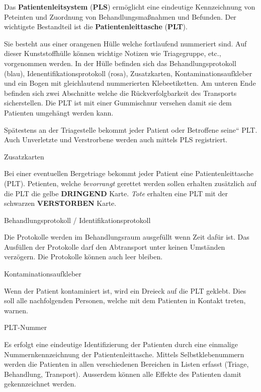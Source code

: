 \documentclass{article}
\newcommand\gT[1]{\textbf{\textup{\textcolor[rgb]{0.0,0.5019608,0.0}{#1}}}}
\newcommand\gE[1]{\textit{#1}}
\begin{document}
{\mdseries
Das \gT{Patientenleitsystem}
(\gT{PLS}) erm\"oglicht eine eindeutige
Kennzeichnung von Peteinten und Zuordnung von Behandlungsma{\ss}nahmen
und Befunden. Der wichtigste Bestandteil ist die
\gT{Patientenleittasche}
(\gT{PLT}). }

{\mdseries
Sie besteht aus einer orangenen H\"ulle welche fortlaufend nummeriert
sind. Auf dieser Kunststoffh\"ulle k\"onnen wichtige Notizen wie
Triagegruppe, etc., vorgenommen werden. In der H\"ulle befinden sich
das Behandlungsprotokoll (blau), Idenentifikationsprotokoll (rosa),
Zusatzkarten, Kontaminationsaufkleber und ein Bogen mit gleichlautend
nummerierten Klebeetiketten. Am unteren Ende befinden sich zwei
Abschnitte welche die R\"uckverfolgbarkeit des Transports
sicherstellen. Die PLT ist mit einer Gummischnur versehen damit sie dem
Patienten umgeh\"angt werden kann. }

{\mdseries
Sp\"atestens an der Triagestelle bekommt jeder Patient oder Betroffene
{\quotedblbase}seine{\textquotedblleft} PLT. Auch Unverletzte und
Verstrorbene werden auch mittels PLS registriert.}

{\mdseries\color{black}
Zusatzkarten}

{\mdseries
Bei einer eventuellen Bergetriage bekommt jeder Patient eine
Patientenleittasche (PLT). Petienten, welche
\gE{bevorrangt} gerettet werden sollen erhalten
zus\"atzlich auf die PLT die gelbe \textbf{DRINGEND} Karte.
\gE{Tote} erhalten eine PLT mit der schwarzen
\textbf{VERSTORBEN}\textbf{ }Karte.}

{\mdseries\color{black}
Behandlungsprotokoll / Identifikationsprotokoll}

{\mdseries
Die Protokolle werden im Behandlungsraum ausgef\"ullt wenn Zeit daf\"ur
ist. Das Ausf\"ullen der Protokolle darf den Abtransport unter keinen
Umst\"anden verz\"ogern. Die Protokolle k\"onnen auch leer bleiben.}

{\mdseries\color{black}
Kontaminationsaufkleber}

{\mdseries
Wenn der Patient kontaminiert ist, wird ein Dreieck auf die PLT geklebt.
Dies soll alle nachfolgenden Personen, welche mit dem Patienten in
Kontakt treten, warnen.}

{\mdseries\color{black}
PLT-Nummer}

{\mdseries
Es erfolgt eine eindeutige Identifizierung der Patienten durch eine
einmalige Nummernkennzeichnung der Patientenleittasche. Mittels
Selbstklebenummern werden die Patienten in allen verschiedenen
Bereichen in Listen erfasst (Triage, Behandlung, Transport). Ausserdem
k\"onnen alle Effekte des Patienten damit gekennzeichnet werden.}
\end{document}
